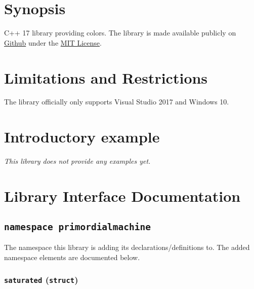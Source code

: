 \documentclass[oneside]{book}
\begin{document}
\frontmatter

\begin{titlepage}
\maketitle
\end{titlepage}

\tableofcontents
{}

\mainmatter

\chapter{Synopsis}
C++ 17 library providing colors.
The library is made available publicly on
\href{\GetLibraryRepository}{Github}
under the
\href{\GetLibraryRepository/blob/master/LICENSE}{MIT License}.

\chapter{Limitations and Restrictions}
The library officially only supports Visual Studio 2017 and Windows 10.

\chapter{Introductory example}
\textit{\color{orange}This library does not provide any examples yet.}



\chapter{Library Interface Documentation}

\section{\texttt{namespace primordialmachine}}
The namespace this library is adding its declarations/definitions to.
The added namespace elements are documented below.

\subsection{\texttt{saturated} (\texttt{struct})}
\end{document}
